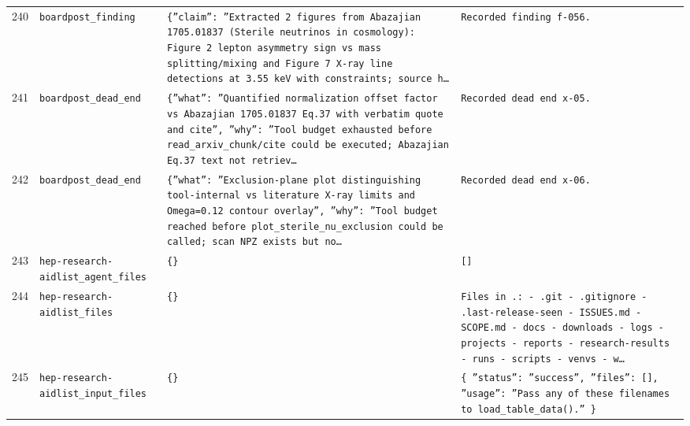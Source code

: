 \documentclass[11pt,a4paper]{article}
\begin{document}
\begin{longtable}{@{}p{}p{}p{}p{}@{}}
240 & \texttt{board}\newline\texttt{post\_\allowbreak{}finding} & \texttt{\{''claim'':\allowbreak{} ''Extracted 2 figures from Abazajian 1705.01837 (Sterile neutrinos in cosmology)\allowbreak{}:\allowbreak{} Figure 2 lepton asymmetry sign vs mass splitting/\allowbreak{}mixing and Figure 7 X-ray line detections at 3.55 keV with constraints;\allowbreak{} source h\ldots{}\allowbreak{}} & \texttt{Recorded finding f-056.} \\
241 & \texttt{board}\newline\texttt{post\_\allowbreak{}dead\_\allowbreak{}end} & \texttt{\{''what'':\allowbreak{} ''Quantified normalization offset factor vs Abazajian 1705.01837 Eq.37 with verbatim quote and cite'',\allowbreak{} ''why'':\allowbreak{} ''Tool budget exhausted before read\_\allowbreak{}arxiv\_\allowbreak{}chunk/\allowbreak{}cite could be executed;\allowbreak{} Abazajian Eq.37 text not retriev\ldots{}\allowbreak{}} & \texttt{Recorded dead end x-05.} \\
242 & \texttt{board}\newline\texttt{post\_\allowbreak{}dead\_\allowbreak{}end} & \texttt{\{''what'':\allowbreak{} ''Exclusion-plane plot distinguishing tool-internal vs literature X-ray limits and Omega=\allowbreak{}0.12 contour overlay'',\allowbreak{} ''why'':\allowbreak{} ''Tool budget reached before plot\_\allowbreak{}sterile\_\allowbreak{}nu\_\allowbreak{}exclusion could be called;\allowbreak{} scan NPZ exists but no\ldots{}\allowbreak{}} & \texttt{Recorded dead end x-06.} \\
243 & \texttt{hep-research-aid}\newline\texttt{list\_\allowbreak{}agent\_\allowbreak{}files} & \texttt{\{\}\allowbreak{}} & \texttt{[]\allowbreak{}} \\
244 & \texttt{hep-research-aid}\newline\texttt{list\_\allowbreak{}files} & \texttt{\{\}\allowbreak{}} & \texttt{Files in .:\allowbreak{}   - .git   - .gitignore   - .last-release-seen   - ISSUES.md   - SCOPE.md   - docs   - downloads   - logs   - projects   - reports   - research-results   - runs   - scripts   - venvs   - w\ldots{}\allowbreak{}} \\
245 & \texttt{hep-research-aid}\newline\texttt{list\_\allowbreak{}input\_\allowbreak{}files} & \texttt{\{\}\allowbreak{}} & \texttt{\{   ''status'':\allowbreak{} ''success'',\allowbreak{}   ''files'':\allowbreak{} []\allowbreak{},\allowbreak{}   ''usage'':\allowbreak{} ''Pass any of these filenames to load\_\allowbreak{}table\_\allowbreak{}data()\allowbreak{}.'' \}\allowbreak{}} \\

\end{longtable}
\end{document}
